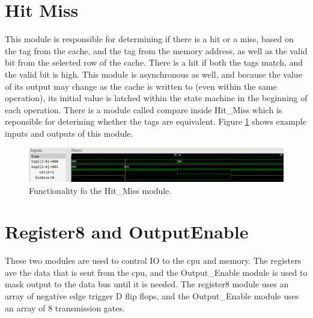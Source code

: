 \documentclass[10pt]{article}
\begin{document}
\section{Hit Miss}
This module is responsible for determining if there is a hit or a miss, based on
the tag from the cache, and the tag from the memory address, as well as the
valid bit from the selected row of the cache. There is a hit if both the tags
match, and the valid bit is high. This module is asynchronous as well, and
because the value of its output may change as the cache is written to (even
within the same operation), its initial value is latched within the state
machine in the beginning of each operation. There is a module called compare
inside Hit_Miss which is reponsible for deterining whether the tags are
equivalent. Figure \ref{hm} shows example inputs and outputs of this module.
\begin{figure}[!htb]
    \centering
    \includegraphics[width=\textwidth]{hm.png}
    \caption{Functionality fo the Hit_Miss module.}
    \label{hm}
\end{figure}
\section{Register8 and OutputEnable}
These two modules are used to control IO to the cpu and memory. The registers
ave the data that is sent from the cpu, and the Output_Enable module is used to
mask output to the data bus until it is needed. The register8 module uses an
array of negative edge trigger D flip flops, and the Output_Enable module uses
an array of 8 transmission gates.
\end{document}
